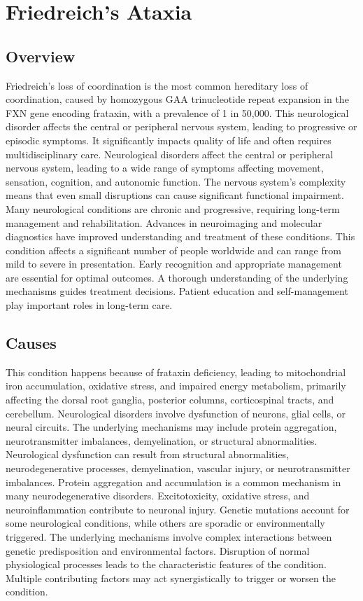 \chapter{Friedreich's Ataxia}
\label{sec:Friedreich's Ataxia}

\section{Overview}
Friedreich's loss of coordination is the most common hereditary loss of coordination, caused by homozygous GAA trinucleotide repeat expansion in the FXN gene encoding frataxin, with a prevalence of 1 in 50,000. This neurological disorder affects the central or peripheral nervous system, leading to progressive or episodic symptoms. It significantly impacts quality of life and often requires multidisciplinary care. Neurological disorders affect the central or peripheral nervous system, leading to a wide range of symptoms affecting movement, sensation, cognition, and autonomic function. The nervous system's complexity means that even small disruptions can cause significant functional impairment. Many neurological conditions are chronic and progressive, requiring long-term management and rehabilitation. Advances in neuroimaging and molecular diagnostics have improved understanding and treatment of these conditions. This condition affects a significant number of people worldwide and can range from mild to severe in presentation. Early recognition and appropriate management are essential for optimal outcomes. A thorough understanding of the underlying mechanisms guides treatment decisions. Patient education and self-management play important roles in long-term care.
\section{Causes}
This condition happens because of frataxin deficiency, leading to mitochondrial iron accumulation, oxidative stress, and impaired energy metabolism, primarily affecting the dorsal root ganglia, posterior columns, corticospinal tracts, and cerebellum. Neurological disorders involve dysfunction of neurons, glial cells, or neural circuits. The underlying mechanisms may include protein aggregation, neurotransmitter imbalances, demyelination, or structural abnormalities. Neurological dysfunction can result from structural abnormalities, neurodegenerative processes, demyelination, vascular injury, or neurotransmitter imbalances. Protein aggregation and accumulation is a common mechanism in many neurodegenerative disorders. Excitotoxicity, oxidative stress, and neuroinflammation contribute to neuronal injury. Genetic mutations account for some neurological conditions, while others are sporadic or environmentally triggered. The underlying mechanisms involve complex interactions between genetic predisposition and environmental factors. Disruption of normal physiological processes leads to the characteristic features of the condition. Multiple contributing factors may act synergistically to trigger or worsen the condition.
